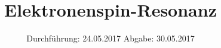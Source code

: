 

\subject{Versuch 28}
\title{Elektronenspin-Resonanz}
\date{
  Durchführung: 24.05.2017
  \hspace{3em}
  Abgabe: 30.05.2017
}

\addto\captionsngerman{%
  \renewcommand{\figurename}{Abb.}%
  \renewcommand{\tablename}{Tab.}%
}



\listoftodos

\maketitle
\thispagestyle{empty}
\tableofcontents
\newpage






\printbibliography



